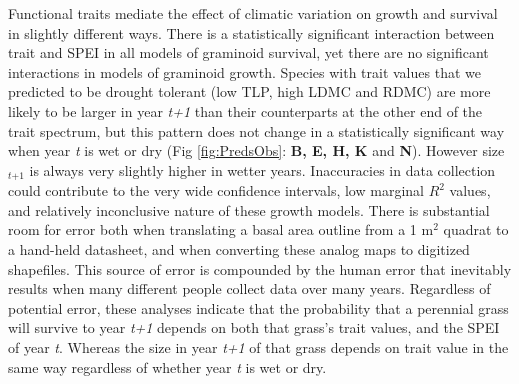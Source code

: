 \documentclass[12pt, letterpaper]{article}
\begin{document}
 Functional traits mediate the effect of climatic variation on growth and survival in slightly different ways. There is a statistically significant interaction between trait and SPEI in all models of graminoid survival, yet there are no significant interactions in models of graminoid growth. Species with trait values that we predicted to be drought tolerant (low TLP, high LDMC and RDMC) are more likely to be larger in year \textit{t+1} than their counterparts at the other end of the trait spectrum, but this pattern does not change in a statistically significant way when year \textit{t} is wet or dry (Fig \ref{fig:PredsObs}: \textbf{B, E, H, K} and \textbf{N}). However size$_\textit{t+1}$ is always very slightly higher in wetter years. Inaccuracies in data collection could contribute to the very wide confidence intervals, low marginal $R^2$ values, and relatively inconclusive nature of these growth models. There is substantial room for error both when translating a basal area outline from a 1 m$^2$ quadrat to a hand-held datasheet, and when converting these analog maps to digitized shapefiles. This source of error is compounded by the human error that inevitably results when many different people collect data over many years. Regardless of potential error, these analyses indicate that the probability that a perennial grass will survive to year \textit{t+1} depends on both that grass's trait values, and the SPEI of year \textit{t}. Whereas the size in year \textit{t+1} of that grass depends on trait value in the same way regardless of whether year \textit{t} is wet or dry.
 
\end{document}
